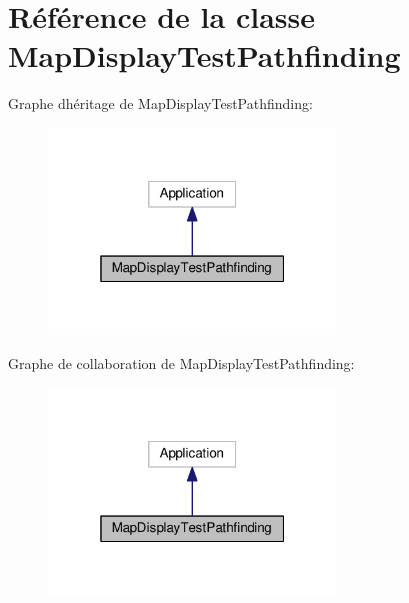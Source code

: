 \hypertarget{classMapDisplayTestPathfinding}{}\section{Référence de la classe Map\+Display\+Test\+Pathfinding}
\label{classMapDisplayTestPathfinding}


Graphe d\textquotesingle{}héritage de Map\+Display\+Test\+Pathfinding\+:\nopagebreak
\begin{figure}[H]
\begin{center}
\leavevmode
\includegraphics[width=217pt]{classMapDisplayTestPathfinding__inherit__graph}
\end{center}
\end{figure}


Graphe de collaboration de Map\+Display\+Test\+Pathfinding\+:\nopagebreak
\begin{figure}[H]
\begin{center}
\leavevmode
\includegraphics[width=217pt]{classMapDisplayTestPathfinding__coll__graph}
\end{center}
\end{figure}
